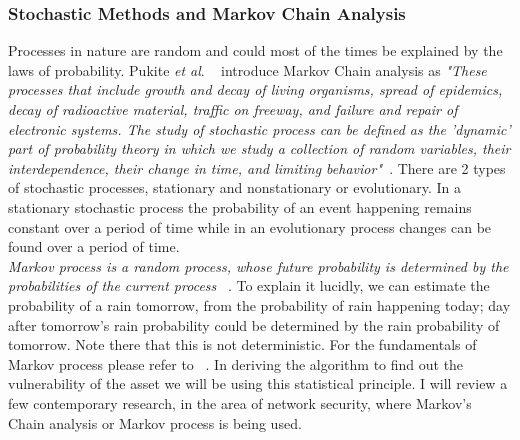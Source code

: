 \subsubsection{Stochastic Methods and Markov Chain Analysis}\label{sec:markov}
Processes in nature are random and could most of the times be explained by the laws of probability. Pukite \textit{et al}. ~\cite{5312000}  introduce Markov Chain analysis as \textit{"These processes that include growth and decay of living organisms, spread of epidemics, decay of radioactive material, traffic on freeway, and failure and repair of electronic systems. The study of stochastic process can be defined as the 'dynamic' part of probability theory in which we study a collection of random variables, their interdependence, their change in time, and limiting behavior"~\cite{5312000}}. There are 2 types of stochastic processes, stationary and nonstationary or evolutionary. In a stationary stochastic process the probability of an event happening remains constant over a period of time while in an evolutionary process changes can be found over a period of time.\\
\textit{Markov process is a random process, whose future probability is determined by the probabilities of the current process} ~\cite{MarkovPr80:online}. To explain it lucidly, we can estimate the probability of a rain tomorrow, from the probability of rain happening today; day after tomorrow's rain probability could be determined by the rain probability of tomorrow. Note there that this is not deterministic. For the fundamentals of Markov process please refer to ~\cite{5312001}. In deriving the algorithm to find out the vulnerability of the asset we will be using this statistical principle. I will review a few contemporary research, in the area of network security, where Markov's Chain analysis or Markov process is being used.\\
